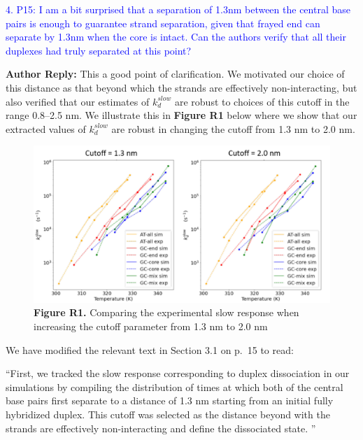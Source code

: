 \documentclass[11pt,a4paper]{letter} %
\newcommand*{\rood}[1]{{\color{red}{#1}}}
\begin{document}
\textcolor{blue}{4. P15: I am a bit surprised that a separation of 1.3nm between the central base pairs is enough to guarantee strand separation, given that frayed end can separate by 1.3nm when the core is intact. Can the authors verify that all their duplexes had truly separated at this point?}

\textbf{Author Reply:}   This a good point of clarification. We motivated our choice of this distance as that beyond which the strands are effectively non-interacting, but also verified that our estimates of $k_d^{slow}$ are robust to choices of this cutoff in the range 0.8--2.5 nm. We illustrate this in \textbf{Figure R1} below where we show that our extracted values of $k_d^{slow}$ are robust in changing the cutoff from 1.3 nm to 2.0 nm.  


\begin{figure}[ht!]
	\begin{center}
        \includegraphics[width=\textwidth]{FigR1.pdf}
        \caption*{\textbf{Figure R1.} Comparing the experimental slow response when increasing the cutoff parameter from 1.3 nm to 2.0 nm}
        \label{fig:compare_cutoffs}
	\end{center}
\end{figure}

We have modified the relevant text in Section 3.1 on p.~15 to read:

``First, we tracked the slow response corresponding to duplex dissociation in our simulations by compiling the distribution of times at which both of the central base pairs first separate to a distance of 1.3 nm starting from an initial fully hybridized duplex. This cutoff was selected as the distance beyond with the strands are effectively non-interacting and define the dissociated state. \rood{We verified that our results were robust to choices of this cutoff over the range 0.8-2.5 nm.}''
\end{document}

